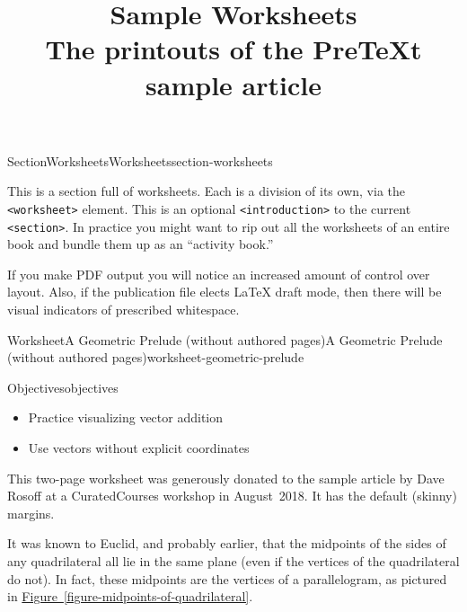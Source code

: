 \documentclass[oneside,10pt,]{article}
\title{Sample Worksheets\\
{\large The printouts of the PreTeXt sample article}}
\date{}
\newcommand{\xreffont}{\relax}
\newcommand{\ptxlistdisc}{\raisebox{0.3ex}{\textbullet}}
\newcommand{\ptxmono}[1]{\texttt{#1}}
\numberwithin{equation}{section}
\begin{document}
\raggedbottom
\hypertarget{sample-worksheets}{}
\maketitle
\thispagestyle{empty}
%
%
\typeout{************************************************}
\typeout{************************************************}
%
\begin{sectionptx}{Section}{Worksheets}{}{Worksheets}{}{}{section-worksheets}
\begin{introduction}{}%
This is a section full of worksheets.  Each is a division of its own, via the \ptxmono{<worksheet>} element.  This is an optional \ptxmono{<introduction>} to the current \ptxmono{<section>}.  In practice you might want to rip out all the worksheets of an entire book and bundle them up as an \textquotedblleft{}activity book.\textquotedblright{}%
\par
If you make PDF output you will notice an increased amount of control over layout.  Also, if the publication file elects \LaTeX{} draft mode, then there will be visual indicators of prescribed whitespace.%
\end{introduction}%
%
%
\typeout{************************************************}
\typeout{************************************************}
%
\begin{worksheet-subsection}{Worksheet}{A Geometric Prelude (without authored pages)}{}{A Geometric Prelude (without authored pages)}{}{}{worksheet-geometric-prelude}
\begin{objectives}{Objectives}{objectives}
%
\begin{itemize}[label=\ptxlistdisc]
\item{}Practice visualizing vector addition%
\item{}Use vectors without explicit coordinates%
\end{itemize}
\end{objectives}
\begin{introduction}{}%
This two-page worksheet was generously donated to the sample article by Dave Rosoff at a CuratedCourses workshop in August~2018.  It has the default (skinny) margins.%
\par
It was known to Euclid, and probably earlier, that the midpoints of the sides of any quadrilateral all lie in the same plane (even if the vertices of the quadrilateral do not). In fact, these midpoints are the vertices of a parallelogram, as pictured in \hyperref[figure-midpoints-of-quadrilateral]{Figure~{\xreffont\ref{figure-midpoints-of-quadrilateral}}}.%

\end{introduction}
\end{worksheet-subsection}
\end{sectionptx}
\end{document}
